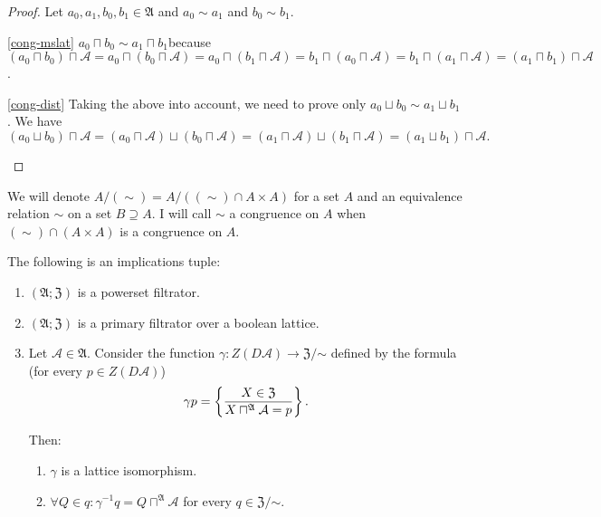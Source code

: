 \begin{proof}
Let $a_{0},a_{1},b_{0},b_{1}\in\mathfrak{A}$ and $a_{0}\sim a_{1}$
and $b_{0}\sim b_{1}$.
\begin{disorder}
\item [{\ref{cong-mslat}}] $a_{0}\sqcap b_{0}\sim a_{1}\sqcap b_{1}$because
$(a_{0}\sqcap b_{0})\sqcap\mathcal{A}=a_{0}\sqcap(b_{0}\sqcap\mathcal{A})=a_{0}\sqcap(b_{1}\sqcap\mathcal{A})=b_{1}\sqcap(a_{0}\sqcap\mathcal{A})=b_{1}\sqcap(a_{1}\sqcap\mathcal{A})=(a_{1}\sqcap b_{1})\sqcap\mathcal{A}$.
\item [{\ref{cong-dist}}] Taking the above into account, we need to prove
only $a_{0}\sqcup b_{0}\sim a_{1}\sqcup b_{1}$. We have
\[
(a_{0}\sqcup b_{0})\sqcap\mathcal{A}=(a_{0}\sqcap\mathcal{A})\sqcup(b_{0}\sqcap\mathcal{A})=(a_{1}\sqcap\mathcal{A})\sqcup(b_{1}\sqcap\mathcal{A})=(a_{1}\sqcup b_{1})\sqcap\mathcal{A}.
\]

\end{disorder}
\end{proof}
\begin{defn}
We will denote $A/(\sim)=A/((\sim)\cap A\times A)$ for a set $A$
and an equivalence relation $\sim$ on a set $B\supseteq A$. I will
call $\sim$ a congruence on $A$ when $(\sim)\cap(A\times A)$
is a congruence on $A$.\end{defn}
\begin{thm}
\label{factor-isomor}The following is an implications tuple:
\begin{enumerate}
\item \label{factor-isomor-p}$(\mathfrak{A};\mathfrak{Z})$ is a powerset
filtrator.
\item \label{factor-isomor-fltr}$(\mathfrak{A};\mathfrak{Z})$ is a primary
filtrator over a boolean lattice.
\item \label{factor-isomor-conc}Let $\mathcal{A}\in\mathfrak{A}$. Consider the function
$\gamma:Z(D\mathcal{A})\rightarrow\mathfrak{Z}/\mathord\sim$ defined
by the formula (for every $p\in Z(D\mathcal{A})$)
\[
\gamma p=\left\{ \frac{X\in\mathfrak{Z}}{X\sqcap^{\mathfrak{A}}\mathcal{A}=p}\right\}.
\]



Then:
\begin{enumerate}
\item $\gamma$ is a lattice isomorphism.
\item $\forall Q\in q:\gamma^{-1}q=Q\sqcap^{\mathfrak{A}}\mathcal{A}$ for
every $q\in\mathfrak{Z}/\mathord\sim$.
\end{enumerate}
\end{enumerate}
\end{thm}
